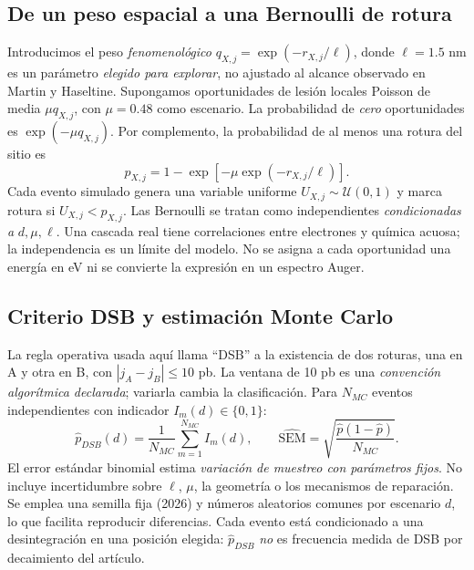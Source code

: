 \documentclass[11pt,a4paper]{article}
\begin{document}
\subsection{De un peso espacial a una Bernoulli de rotura}
Introducimos el peso \emph{fenomenológico} $q_{X,j}=\exp(-r_{X,j}/\ell)$, donde $\ell=1.5$ nm es un parámetro \emph{elegido para explorar}, no ajustado al alcance observado en Martin y Haseltine. Supongamos oportunidades de lesión locales Poisson de media $\mu q_{X,j}$, con $\mu=0.48$ como escenario. La probabilidad de \emph{cero} oportunidades es $\exp(-\mu q_{X,j})$. Por complemento, la probabilidad de al menos una rotura del sitio es
\begin{equation}\boxed{p_{X,j}=1-\exp[-\mu\exp(-r_{X,j}/\ell)].}\label{eq:ssb}\end{equation}
Cada evento simulado genera una variable uniforme $U_{X,j}\sim\mathcal U(0,1)$ y marca rotura si $U_{X,j}<p_{X,j}$. Las Bernoulli se tratan como independientes \emph{condicionadas a} $d,\mu,\ell$. Una cascada real tiene correlaciones entre electrones y química acuosa; la independencia es un límite del modelo. No se asigna a cada oportunidad una energía en eV ni se convierte la expresión en un espectro Auger.

\subsection{Criterio DSB y estimación Monte Carlo}
La regla operativa usada aquí llama ``DSB'' a la existencia de dos roturas, una en A y otra en B, con $|j_A-j_B|\leq10$ pb. La ventana de 10 pb es una \emph{convención algorítmica declarada}; variarla cambia la clasificación. Para $N_{MC}$ eventos independientes con indicador $I_m(d)\in\{0,1\}$:
\begin{equation}\widehat p_{DSB}(d)=\frac{1}{N_{MC}}\sum_{m=1}^{N_{MC}}I_m(d),\qquad
\widehat{\mathrm{SEM}}=\sqrt{\frac{\widehat p(1-\widehat p)}{N_{MC}}}.\end{equation}
El error estándar binomial estima \emph{variación de muestreo con parámetros fijos}. No incluye incertidumbre sobre $\ell$, $\mu$, la geometría o los mecanismos de reparación. Se emplea una semilla fija (2026) y números aleatorios comunes por escenario $d$, lo que facilita reproducir diferencias. Cada evento está condicionado a una desintegración en una posición elegida: $\widehat p_{DSB}$ \emph{no} es frecuencia medida de DSB por decaimiento del artículo.
\end{document}
